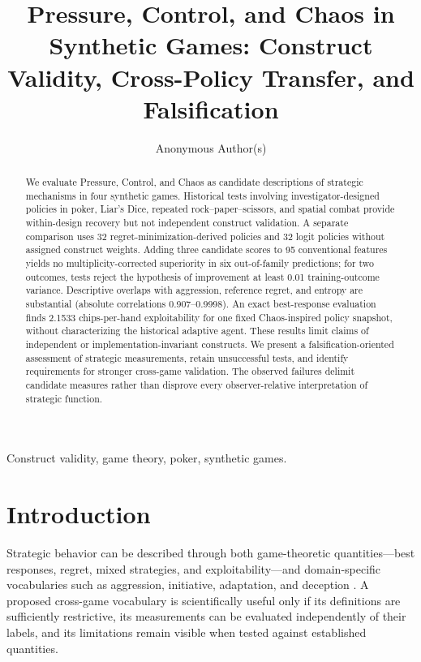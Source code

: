 \documentclass[journal]{IEEEtran}
\begin{document}
\title{Pressure, Control, and Chaos in Synthetic Games: Construct Validity, Cross-Policy Transfer, and Falsification}

\author{Anonymous Author(s)}


\maketitle

\begin{abstract}
We evaluate Pressure, Control, and Chaos as candidate descriptions of strategic mechanisms in four synthetic games. Historical tests involving investigator-designed policies in poker, Liar's Dice, repeated rock--paper--scissors, and spatial combat provide within-design recovery but not independent construct validation. A separate comparison uses 32 regret-minimization-derived policies and 32 logit policies without assigned construct weights. Adding three candidate scores to 95 conventional features yields no multiplicity-corrected superiority in six out-of-family predictions; for two outcomes, tests reject the hypothesis of improvement at least 0.01 training-outcome variance. Descriptive overlaps with aggression, reference regret, and entropy are substantial (absolute correlations 0.907--0.9998). An exact best-response evaluation finds 2.1533 chips-per-hand exploitability for one fixed Chaos-inspired policy snapshot, without characterizing the historical adaptive agent. These results limit claims of independent or implementation-invariant constructs. We present a falsification-oriented assessment of strategic measurements, retain unsuccessful tests, and identify requirements for stronger cross-game validation. The observed failures delimit candidate measures rather than disprove every observer-relative interpretation of strategic function.
\end{abstract}

\begin{IEEEkeywords}
Construct validity, game theory, poker, synthetic games.
\end{IEEEkeywords}

\section{Introduction}

Strategic behavior can be described through both game-theoretic quantities---best responses, regret, mixed strategies, and exploitability---and domain-specific vocabularies such as aggression, initiative, adaptation, and deception \cite{vonneumann1944,nash1950,osborne1994}. A proposed cross-game vocabulary is scientifically useful only if its definitions are sufficiently restrictive, its measurements can be evaluated independently of their labels, and its limitations remain visible when tested against established quantities.
\end{document}
